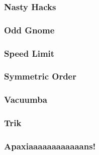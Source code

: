 \documentclass[hidelinks]{article}
\begin{document}
            \subsubsection{Nasty Hacks}
                
            \subsubsection{Odd Gnome}
                
            \subsubsection{Speed Limit}
                
            \subsubsection{Symmetric Order}
                
            \subsubsection{Vacuumba}
                
            \subsubsection{Trik}
                
            \subsubsection{Apaxiaaaaaaaaaaaans!}
                
    
\end{document}
